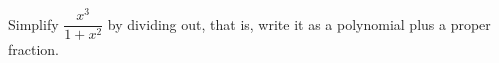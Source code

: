 Simplify $\dfrac{x^3}{1+x^2}$ by dividing out, that is, write it as a polynomial plus a proper fraction.
